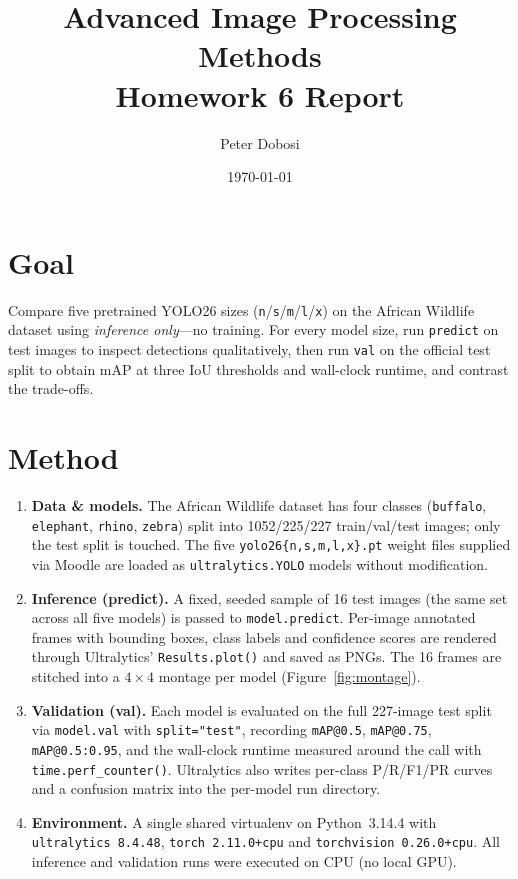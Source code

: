\documentclass[11pt,a4paper]{article}
\title{Advanced Image Processing Methods\\Homework 6 Report}
\author{Peter Dobosi}
\date{\today}
\begin{document}
\maketitle

\section*{Goal}
Compare five pretrained YOLO26 sizes (\texttt{n}/\texttt{s}/\texttt{m}/\texttt{l}/\texttt{x}) on the African Wildlife dataset using \emph{inference only}---no training. For every model size, run \texttt{predict} on test images to inspect detections qualitatively, then run \texttt{val} on the official test split to obtain mAP at three IoU thresholds and wall-clock runtime, and contrast the trade-offs.

\section*{Method}
\begin{enumerate}[leftmargin=*,itemsep=1pt,topsep=2pt]
    \item \textbf{Data \& models.} The African Wildlife dataset has four classes (\texttt{buffalo}, \texttt{elephant}, \texttt{rhino}, \texttt{zebra}) split into 1052/225/227 train/val/test images; only the test split is touched. The five \texttt{yolo26\{n,s,m,l,x\}.pt} weight files supplied via Moodle are loaded as \texttt{ultralytics.YOLO} models without modification.

    \item \textbf{Inference (predict).} A fixed, seeded sample of 16 test images (the same set across all five models) is passed to \texttt{model.predict}. Per-image annotated frames with bounding boxes, class labels and confidence scores are rendered through Ultralytics' \texttt{Results.plot()} and saved as PNGs. The 16 frames are stitched into a $4\times4$ montage per model (Figure~\ref{fig:montage}).

    \item \textbf{Validation (val).} Each model is evaluated on the full 227-image test split via \texttt{model.val} with \texttt{split="test"}, recording \texttt{mAP@0.5}, \texttt{mAP@0.75}, \texttt{mAP@0.5:0.95}, and the wall-clock runtime measured around the call with \texttt{time.perf\_counter()}. Ultralytics also writes per-class P/R/F1/PR curves and a confusion matrix into the per-model run directory.

    \item \textbf{Environment.} A single shared virtualenv on Python~3.14.4 with \texttt{ultralytics 8.4.48}, \texttt{torch 2.11.0+cpu} and \texttt{torchvision 0.26.0+cpu}. All inference and validation runs were executed on CPU (no local GPU).
\end{enumerate}
\end{document}
